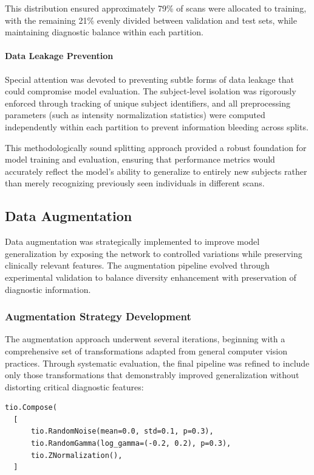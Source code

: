 \documentclass[12pt, a4paper]{article}
\begin{document}
This distribution ensured approximately 79\% of scans were allocated to training, with the remaining 21\% evenly divided between validation and test sets, while maintaining diagnostic balance within each partition.

\paragraph{Data Leakage Prevention}

Special attention was devoted to preventing subtle forms of data leakage that could compromise model evaluation. The subject-level isolation was rigorously enforced through tracking of unique subject identifiers, and all preprocessing parameters (such as intensity normalization statistics) were computed independently within each partition to prevent information bleeding across splits.

This methodologically sound splitting approach provided a robust foundation for model training and evaluation, ensuring that performance metrics would accurately reflect the model's ability to generalize to entirely new subjects rather than merely recognizing previously seen individuals in different scans.

\subsection{Data Augmentation}

Data augmentation was strategically implemented to improve model generalization by exposing the network to controlled variations while preserving clinically relevant features. The augmentation pipeline evolved through experimental validation to balance diversity enhancement with preservation of diagnostic information.

\subsubsection{Augmentation Strategy Development}

The augmentation approach underwent several iterations, beginning with a comprehensive set of transformations adapted from general computer vision practices. Through systematic evaluation, the final pipeline was refined to include only those transformations that demonstrably improved generalization without distorting critical diagnostic features:

\begin{verbatim}
tio.Compose(
  [
      tio.RandomNoise(mean=0.0, std=0.1, p=0.3),
      tio.RandomGamma(log_gamma=(-0.2, 0.2), p=0.3),
      tio.ZNormalization(),
  ]
\end{verbatim}
\end{document}
